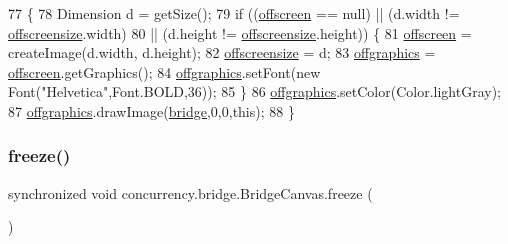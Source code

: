 \begin{DoxyCode}
77                            \{
78         Dimension d = getSize();
79         \textcolor{keywordflow}{if} ((\mbox{\hyperlink{classconcurrency_1_1bridge_1_1_bridge_canvas_a4cec0da8bb85dc5d656839dd0749a6ca}{offscreen}} == null) || (d.width != \mbox{\hyperlink{classconcurrency_1_1bridge_1_1_bridge_canvas_ae145b2afc3e45b132c0684dd8a831e9e}{offscreensize}}.width)
80                                 || (d.height != \mbox{\hyperlink{classconcurrency_1_1bridge_1_1_bridge_canvas_ae145b2afc3e45b132c0684dd8a831e9e}{offscreensize}}.height)) \{
81             \mbox{\hyperlink{classconcurrency_1_1bridge_1_1_bridge_canvas_a4cec0da8bb85dc5d656839dd0749a6ca}{offscreen}} = createImage(d.width, d.height);
82             \mbox{\hyperlink{classconcurrency_1_1bridge_1_1_bridge_canvas_ae145b2afc3e45b132c0684dd8a831e9e}{offscreensize}} = d;
83             \mbox{\hyperlink{classconcurrency_1_1bridge_1_1_bridge_canvas_a3b4e5707689a65fee4d96c5cd1017a52}{offgraphics}} = \mbox{\hyperlink{classconcurrency_1_1bridge_1_1_bridge_canvas_a4cec0da8bb85dc5d656839dd0749a6ca}{offscreen}}.getGraphics();
84             \mbox{\hyperlink{classconcurrency_1_1bridge_1_1_bridge_canvas_a3b4e5707689a65fee4d96c5cd1017a52}{offgraphics}}.setFont(\textcolor{keyword}{new} Font(\textcolor{stringliteral}{"Helvetica"},Font.BOLD,36));
85         \}
86         \mbox{\hyperlink{classconcurrency_1_1bridge_1_1_bridge_canvas_a3b4e5707689a65fee4d96c5cd1017a52}{offgraphics}}.setColor(Color.lightGray);
87         \mbox{\hyperlink{classconcurrency_1_1bridge_1_1_bridge_canvas_a3b4e5707689a65fee4d96c5cd1017a52}{offgraphics}}.drawImage(\mbox{\hyperlink{classconcurrency_1_1bridge_1_1_bridge_canvas_a093c40564a9ca64281c41956931f76a8}{bridge}},0,0,\textcolor{keyword}{this});
88     \}
\end{DoxyCode}
\mbox{\label{classconcurrency_1_1bridge_1_1_bridge_canvas_a777eb5e18c6ee3a77ef029230101f2d1}} 
\subsubsection{\texorpdfstring{freeze()}{freeze()}}
{\footnotesize\ttfamily synchronized void concurrency.\+bridge.\+Bridge\+Canvas.\+freeze (\begin{DoxyParamCaption}{ }\end{DoxyParamCaption})\hspace{0.3cm}{\ttfamily [inline]}}


